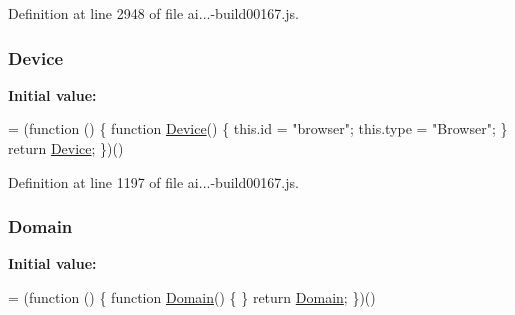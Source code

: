 Definition at line 2948 of file ai...-\/build00167.\+js.

\subsubsection[{\texorpdfstring{Device}{Device}}]{ Device}\hypertarget{_scripts_2ai_80_822_89-build00167_8js_a8a8c87708717f319fc6104f268130638}{}\label{_scripts_2ai_80_822_89-build00167_8js_a8a8c87708717f319fc6104f268130638}
{\bfseries Initial value\+:}
\begin{DoxyCode}
= (\textcolor{keyword}{function} () \{
                \textcolor{keyword}{function} \hyperlink{obj_2_release_2_package_2_package_tmp_2_scripts_2ai_80_822_89-build00167_8js_a8a8c87708717f319fc6104f268130638}{Device}() \{
                    this.\textcolor{keywordtype}{id} = \textcolor{stringliteral}{"browser"};
                    this.type = \textcolor{stringliteral}{"Browser"};
                \}
                \textcolor{keywordflow}{return} \hyperlink{obj_2_release_2_package_2_package_tmp_2_scripts_2ai_80_822_89-build00167_8js_a8a8c87708717f319fc6104f268130638}{Device};
            \})()
\end{DoxyCode}


Definition at line 1197 of file ai...-\/build00167.\+js.

\subsubsection[{\texorpdfstring{Domain}{Domain}}]{ Domain}\hypertarget{_scripts_2ai_80_822_89-build00167_8js_a0178ef80afcba95b4ff5882194185f95}{}\label{_scripts_2ai_80_822_89-build00167_8js_a0178ef80afcba95b4ff5882194185f95}
{\bfseries Initial value\+:}
\begin{DoxyCode}
= (\textcolor{keyword}{function} () \{
            \textcolor{keyword}{function} \hyperlink{obj_2_release_2_package_2_package_tmp_2_scripts_2ai_80_822_89-build00167_8js_a0178ef80afcba95b4ff5882194185f95}{Domain}() \{
            \}
            \textcolor{keywordflow}{return} \hyperlink{obj_2_release_2_package_2_package_tmp_2_scripts_2ai_80_822_89-build00167_8js_a0178ef80afcba95b4ff5882194185f95}{Domain};
        \})()
\end{DoxyCode}


